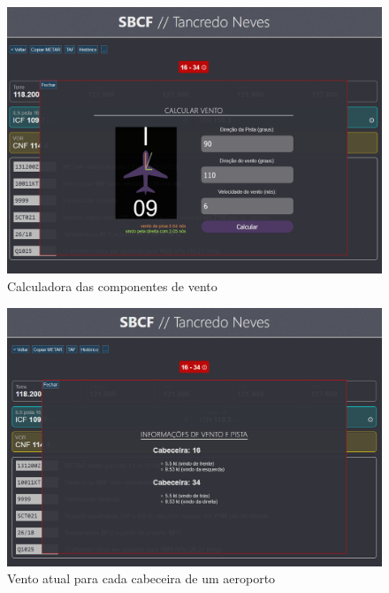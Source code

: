 \begin{figure}[H]
    \begin{center}
    \includegraphics[width=\linewidth]{img/wind.png}
    \caption{Calculadora das componentes de vento}
    \label{fig:wind-calc}
    \end{center}
\end{figure}

\begin{figure}[H]
    \begin{center}
    \includegraphics[width=\linewidth]{img/wind-info.png}
    \caption{Vento atual para cada cabeceira de um aeroporto}
    \label{fig:wind-calc}
    \end{center}
\end{figure}

